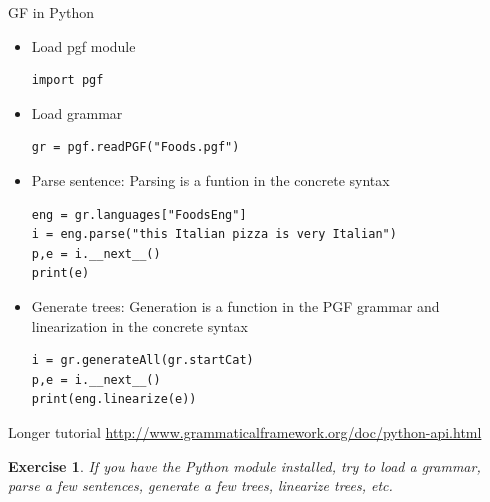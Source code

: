 \documentclass{beamer}
\newtheorem{exercise}{Exercise}
\begin{document}
\begin{frame}[fragile]{GF in Python}
  \begin{itemize}
  \item Load pgf module
\begin{verbatim}
import pgf
\end{verbatim}
\item Load grammar
\begin{verbatim}
gr = pgf.readPGF("Foods.pgf")
\end{verbatim}
\item Parse sentence: Parsing is a funtion in the concrete syntax
\begin{verbatim}
eng = gr.languages["FoodsEng"]
i = eng.parse("this Italian pizza is very Italian")
p,e = i.__next__()
print(e)
\end{verbatim}
\item Generate trees: Generation is a function in the PGF grammar and linearization in the concrete syntax
\begin{verbatim}
i = gr.generateAll(gr.startCat)
p,e = i.__next__()
print(eng.linearize(e))
\end{verbatim}
  \end{itemize}
  Longer tutorial \url{http://www.grammaticalframework.org/doc/python-api.html}
\end{frame}
\begin{frame}
  \begin{exercise}
    If you have the Python module installed, try to load a grammar, parse a few sentences, generate a few trees, linearize trees, etc.
  \end{exercise}
\end{frame}
\end{document}
